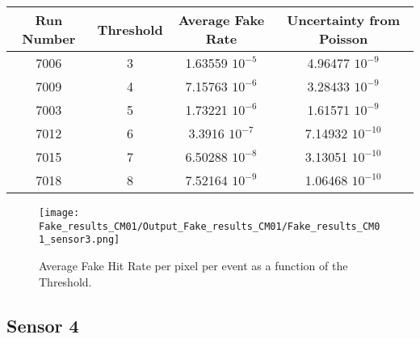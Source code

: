 \documentclass[a4papper, 11pt]{article}
\begin{document}
            \begin{center}
                \begin{tabular}{|c|c|c|c|}
                  \hline %
\rowcolor{light-gray}  Run Number  &   Threshold   &   Average Fake Rate    &   Uncertainty from Poisson         \tabularnewline
                  \hline %
                        7006    &       3       &  1.63559 $10^{-5}$  & 4.96477 $10^{-9}$ \tabularnewline
                  \hline %
                        7009    &       4       &  7.15763 $10^{-6}$  & 3.28433 $10^{-9}$ \tabularnewline
                  \hline %
                        7003    &       5       &  1.73221 $10^{-6}$  & 1.61571 $10^{-9}$ \tabularnewline
                  \hline %
                        7012    &       6       &  3.3916 $10^{-7}$  & 7.14932 $10^{-10}$ \tabularnewline
                  \hline %
                        7015    &       7       &  6.50288 $10^{-8}$  & 3.13051 $10^{-10}$ \tabularnewline
                  \hline %
                        7018    &       8       &  7.52164 $10^{-9}$  & 1.06468 $10^{-10}$ \tabularnewline
                  \hline %
                \end{tabular}
            \end{center}
        \begin{figure}[!h]
            \centering
            \texttt{[image: Fake\_results\_CM01/Output\_Fake\_results\_CM01/Fake\_results\_CM01\_sensor3.png]}
            \caption{Average Fake Hit Rate per pixel per event as a function of the Threshold.}
        \end{figure}
    \FloatBarrier 

        \subsection{Sensor 4}
\end{document}

